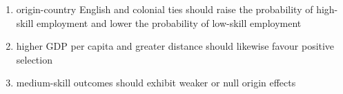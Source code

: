 \documentclass[12pt, a4paper]{article}
\begin{document}
\begin{enumerate}[label=(\roman*)]
    \item origin-country English and colonial ties should raise the probability of high-skill employment and lower the probability of low-skill employment
    \item higher GDP per capita and greater distance should likewise favour positive selection
    \item medium-skill outcomes should exhibit weaker or null origin effects
\end{enumerate}
\end{document}
